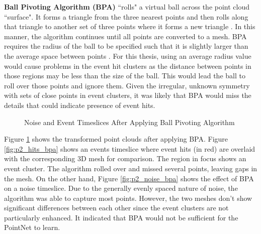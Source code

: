 \textbf{Ball Pivoting Algorithm (BPA)} ``rolls" a virtual ball across the point cloud ``surface". It forms a triangle from the three nearest points and then rolls along that triangle to another set of three points where it forms a new triangle \cite{bernardini1999ball}. In this manner, the algorithm continues until all points are converted to a mesh. BPA requires the radius of the ball to be specified such that it is slightly larger than the average space between points \cite{bernardini1999ball}. For this thesis, using an average radius value would cause problems in the event hit clusters as the distance between points in those regions may be less than the size of the ball. This would lead the ball to roll over those points and ignore them. Given the irregular, unknown symmetry with sets of close points in event clusters, it was likely that BPA would miss the details that could indicate presence of event hits. 

\begin{figure}[ht!]   
\centering
{}
\hspace{0.01cm}
\caption[]{Noise and Event Timeslices After Applying Ball Pivoting Algorithm}
\label{fig:p2_bpa}
\end{figure}

Figure \ref{fig:p2_bpa} shows the transformed point clouds after applying BPA. Figure \ref{fig:p2_hits_bpa} shows an events timeslice where event hits (in red) are overlaid with the corresponding 3D mesh for comparison. The region in focus shows an event cluster. The algorithm rolled over and missed several points, leaving gaps in the mesh. On the other hand, Figure \ref{fig:p2_noise_bpa} shows the effect of BPA on a noise timeslice. Due to the generally evenly spaced nature of noise, the algorithm was able to capture most points. However, the two meshes don't show significant differences between each other since the event clusters are not particularly enhanced. It indicated that BPA would not be sufficient for the PointNet to learn. 


